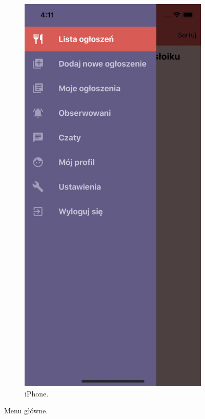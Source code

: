 \documentclass[licencjacka]{pracamgr}
\begin{document}
\begin{figure}[h!]
\begin{subfigure}[b]{0.4\linewidth}
\begin{framed}
     \includegraphics[width=\linewidth]{ios3.jpg}
    \end{framed}
    \caption{iPhone.}
  \end{subfigure}
  \caption{Menu główne.}
  \label{fig:menu}
\end{figure}
\end{document}
